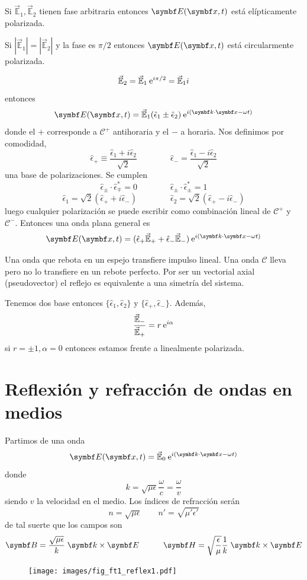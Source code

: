 \documentclass[10pt,oneside]{CBFT_book}
\begin{document}
Si $\vec{\mathbb{E}}_1,\vec{\mathbb{E}}_2$ tienen fase arbitraria entonces $\vb{E}( \vb{x},t )$ está elípticamente 
polarizada.

Si $|\vec{\mathbb{E}}_1|=|\vec{\mathbb{E}}_2|$ y la fase es $\pi/2$ entonces $\vb{E}( \vb{x},t )$ está circularmente 
polarizada.

\[
	\vec{\mathbb{E}}_2 = \vec{\mathbb{E}}_1 \:\mathrm{e}^{i \pi/2} =\vec{\mathbb{E}}_1 i
\]
entonces
\[
	\vb{E}( \vb{x},t )= \vec{\mathbb{E}}_1 (\hat{\epsilon}_1  \pm \hat{\epsilon}_2 )
				\euler^{i( \pe{k}{x} -\omega t)}	
\]
donde el $+$ corresponde a $\mathcal{C}^+$ antihoraria y el $-$ a horaria. Nos definimos por comodidad,
\[
	\hat{\epsilon}_+ \equiv \frac{\hat{\epsilon}_1 + i \hat{\epsilon}_2 }{\sqrt{2}} \qquad\qquad 
	\hat{\epsilon}_- = \frac{\hat{\epsilon}_1 - i \hat{\epsilon}_2 }{\sqrt{2}}
\]
una base de polarizaciones. Se cumplen
\[
	\hat{\epsilon}_\pm \cdot \hat{\epsilon}_\mp^* = 0 \qquad \qquad 
	\hat{\epsilon}_\pm \cdot \hat{\epsilon}_\pm^* = 1
\]
\[
	\hat{\epsilon}_1 = \sqrt{2}( \hat{\epsilon}_+ + i \hat{\epsilon}_- ) \qquad \qquad 
	\hat{\epsilon}_2 = \sqrt{2}( \hat{\epsilon}_+ - i \hat{\epsilon}_- )
\]
luego cualquier polarización se puede escribir como combinación lineal de $\mathcal{C}^+$ y $\mathcal{C}^-$.
Entonces una onda plana general es
\[
	\vb{E}( \vb{x},t )=(\hat{\epsilon}_+ \vec{\mathbb{E}}_+ + 
			\hat{\epsilon}_-\vec{\mathbb{E}}_-) \euler^{i( \pe{k}{x} -\omega t)}
\]

Una onda que rebota en un espejo transfiere impulso lineal. Una onda $\mathcal{C}$ lleva  pero no lo transfiere 
en un rebote perfecto. Por ser  un vectorial axial (pseudovector) el reflejo es equivalente a una simetría del 
sistema.

Tenemos dos base entonces $\{ \hat{\epsilon}_1 ,\hat{\epsilon}_2 \}$ y $\{ \hat{\epsilon}_+ ,\hat{\epsilon}_- \}$.
Además,
\[
	\frac{\vec{\mathbb{E}}_-}{\vec{\mathbb{E}}_+} = r\:\mathrm{e}^{i\alpha} 
\]
si $r = \pm 1, \alpha=0 $ entonces estamos frente a linealmente polarizada.

\section{Reflexión y refracción de ondas en medios}

Partimos de una onda
\[
	\vb{E}( \vb{x},t )= \vec{\mathbb{E}}_0 \euler^{i( \pe{k}{x} -\omega t)}
\]
donde 
\[
	k = \sqrt{\mu\epsilon} \frac{\omega}{c} = \frac{\omega}{v}
\]
siendo $v$ la velocidad en el medio. Los índices de refracción serán 
\[
	n = \sqrt{\mu \epsilon} \qquad  n' = \sqrt{\mu' \epsilon'}
\]
de tal suerte que los campos son 
\[
	\vb{B} = \frac{\sqrt{\mu\epsilon}}{k} \; \pv{k}{E} \qquad \quad 
		\vb{H} = \sqrt{\frac{\epsilon}{\mu}} \frac{1}{k} \; \pv{k}{E}
\]
\begin{figure}[htb]
	\begin{center}
	\texttt{[image: images/fig\_ft1\_reflex1.pdf]}	 
	\end{center}
	\caption{}
\end{figure} 
\end{document}
